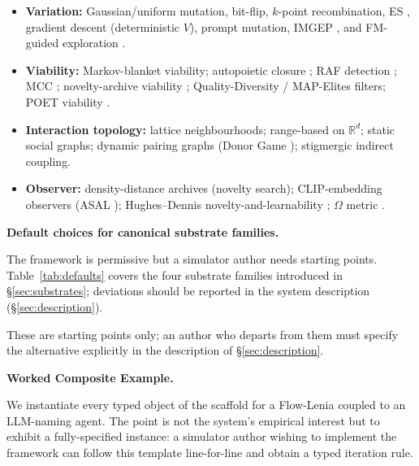 \documentclass[journal]{IEEEtran}
\theoremstyle{plain}
\theoremstyle{definition}
\theoremstyle{plain}
\newcounter{topic}[subsection]
\newcommand{\topic}[1]{%
  \refstepcounter{topic}%
  \par\smallskip\noindent\textbf{#1.}\ }
\newcommand{\R}{\mathbb{R}}
\begin{document}
\begin{itemize}[leftmargin=1.5em,itemsep=3pt]
  \item \textbf{Variation:} Gaussian/uniform mutation, bit-flip, $k$-point
    recombination, ES \cite{salimans2017es}, gradient descent
    (deterministic $V$), prompt mutation, IMGEP \cite{forestier2022imgep},
    and FM-guided exploration \cite{kumar2024asal,faldor2024omniepic}.
  \item \textbf{Viability:} Markov-blanket viability; autopoietic closure
    \cite{beer2014glider,beer2015autopoiesis,beer2020origin}; RAF detection
    \cite{hordijk2004raf,hordijk2015algorithms}; MCC \cite{brant2017mcc};
    novelty-archive viability \cite{lehman2011novelty}; Quality-Diversity /
    MAP-Elites filters; POET viability \cite{wang2019poet,wang2020enhanced}.
  \item \textbf{Interaction topology:} lattice neighbourhoods; range-based
    on $\R^d$; static social graphs; dynamic pairing graphs (Donor Game
    \cite{vallinder2024cultural}); stigmergic indirect coupling.
  \item \textbf{Observer:} density-distance archives (novelty search);
    CLIP-embedding observers (ASAL \cite{kumar2024asal});
    Hughes--Dennis novelty-and-learnability \cite{hughes2024openendedness};
    $\Omega$ metric \cite{lopezdiaz2025undecidability}.
\end{itemize}

\topic{Default choices for canonical substrate families}\label{sec:defaults}

The framework is permissive but a simulator author needs starting points.
Table~\ref{tab:defaults} covers the four substrate families introduced in
\S\ref{sec:substrates}; deviations should be reported in the
system description (\S\ref{sec:description}).

These are starting points only; an author who departs from them must
specify the alternative explicitly in the description of
\S\ref{sec:description}.

\topic{Worked Composite Example}\label{sec:worked}

We instantiate every typed object of the scaffold for a Flow-Lenia coupled
to an LLM-naming agent. The point is not the system's empirical interest
but to exhibit a fully-specified instance: a simulator author wishing to
implement the framework can follow this template line-for-line and obtain
a typed iteration rule.
\end{document}
